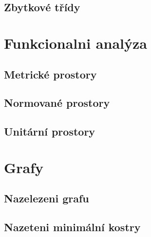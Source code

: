 \documentclass[12pt,a4paper,notitlepage,final]{article}
\begin{document}
\subsection{Zbytkové třídy}                   

\section{Funkcionalni analýza}
\subsection{Metrické prostory}                	
\subsection{Normované prostory}                	
\subsection{Unitární prostory}                	

\section{Grafy}
\subsection{Nazelezeni grafu}                	
\subsection{Nazeteni minimální kostry} 				
\end{document}
